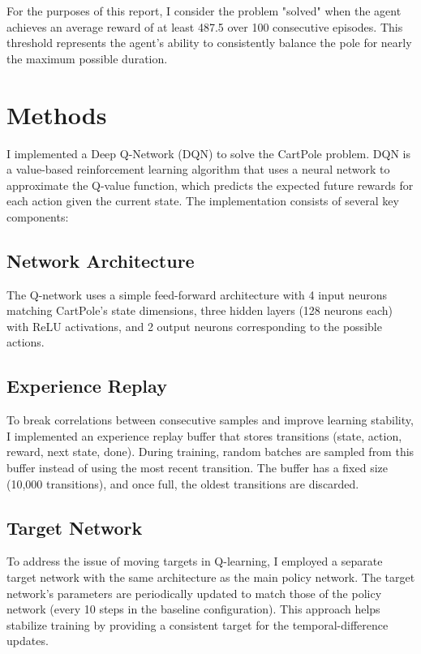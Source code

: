 \documentclass{article}
\begin{document}
For the purposes of this report, I consider the problem "solved" when the agent achieves an average reward of at least 487.5 over 100 consecutive episodes. This threshold represents the agent's ability to consistently balance the pole for nearly the maximum possible duration.

\section{Methods}
I implemented a Deep Q-Network (DQN) to solve the CartPole problem. DQN is a value-based reinforcement learning algorithm that uses a neural network to approximate the Q-value function, which predicts the expected future rewards for each action given the current state. The implementation consists of several key components:

\subsection{Network Architecture}
The Q-network uses a simple feed-forward architecture with 4 input neurons matching CartPole's state dimensions, three hidden layers (128 neurons each) with ReLU activations, and 2 output neurons corresponding to the possible actions.

\subsection{Experience Replay}
To break correlations between consecutive samples and improve learning stability, I implemented an experience replay buffer \cite{mnih2013} that stores transitions (state, action, reward, next state, done). During training, random batches are sampled from this buffer instead of using the most recent transition. The buffer has a fixed size (10,000 transitions), and once full, the oldest transitions are discarded.

\subsection{Target Network}
To address the issue of moving targets in Q-learning, I employed a separate target network \cite{mnih2015} with the same architecture as the main policy network. The target network's parameters are periodically updated to match those of the policy network (every 10 steps in the baseline configuration). This approach helps stabilize training by providing a consistent target for the temporal-difference updates.
\end{document}
